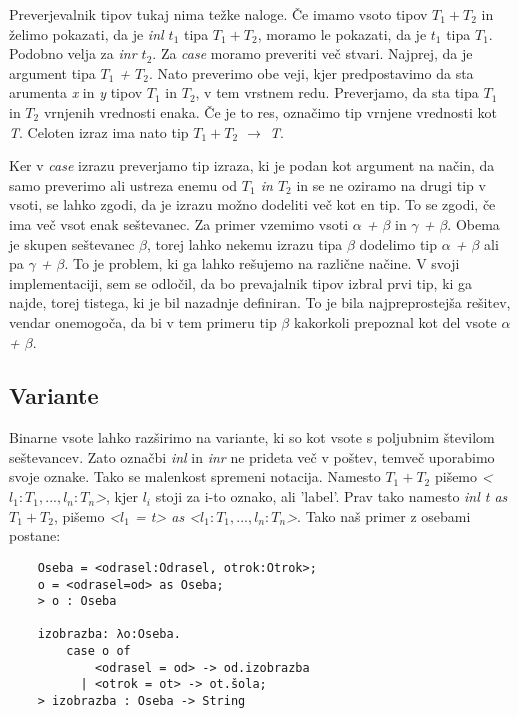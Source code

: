 \documentclass[a4paper]{report}
\begin{document}
Preverjevalnik tipov tukaj nima težke naloge. Če imamo vsoto tipov \(T_1 + T_2\) in želimo pokazati, da je \emph{inl $t_1$} tipa \emph{$T_1 + T_2$}, moramo le pokazati, da je 
\emph{$t_1$} tipa \emph{$T_1$}. Podobno velja za \emph{inr $t_2$}. Za \emph{case} moramo preveriti več stvari. Najprej, da je argument tipa \emph{$T_1$ + $T_2$}. Nato preverimo 
obe veji, kjer predpostavimo da sta arumenta \emph{x} in \emph{y} tipov \emph{$T_1$} in \emph{$T_2$}, v tem vrstnem redu. Preverjamo, da sta tipa \emph{$T_1$} in \emph{$T_2$} 
vrnjenih vrednosti enaka. Če je to res, označimo tip vrnjene vrednosti kot \emph{T}. Celoten izraz ima nato tip \emph{$T_1 + T_2$ $\rightarrow$ T}.

Ker v \emph{case} izrazu preverjamo tip izraza, ki je podan kot argument na način, da samo preverimo ali ustreza enemu od \emph{\(T_1\) in \(T_2\)} in se ne oziramo na drugi tip v vsoti, 
se lahko zgodi, da je izrazu možno dodeliti več kot en tip. To se zgodi, če ima več vsot enak seštevanec. Za primer vzemimo vsoti \emph{$\alpha$ + $\beta$} in \emph{$\gamma$ + $\beta$}.
Obema je skupen seštevanec \emph{$\beta$}, torej lahko nekemu izrazu tipa \emph{$\beta$} dodelimo tip \emph{$\alpha$ + $\beta$} ali pa \emph{$\gamma$ + $\beta$}. To je problem, ki ga
lahko rešujemo na različne načine. V svoji implementaciji, sem se odločil, da bo prevajalnik tipov izbral prvi tip, ki ga najde, torej tistega, ki je bil nazadnje definiran. To je bila 
najpreprostejša rešitev, vendar onemogoča, da bi v tem primeru tip \emph{$\beta$} kakorkoli prepoznal kot del vsote \emph{$\alpha$ + $\beta$}.

\subsection{Variante}
Binarne vsote lahko razširimo na variante, ki so kot vsote s poljubnim številom seštevancev. Zato označbi \emph{inl} in \emph{inr} ne prideta več v poštev, temveč uporabimo svoje oznake. 
Tako se malenkost spremeni notacija. Namesto \emph{$T_1 + T_2$} pišemo \emph{<$l_1:T_1, ... , l_n:T_n$>}, kjer \(l_i\) stoji za i-to oznako, ali 'label'. Prav tako namesto \emph{inl t as 
$T_1 + T_2$}, pišemo \emph{<$l_1$ = t> as <$l_1:T_1, ... , l_n:T_n$>}. Tako naš primer z osebami postane:
\begin{lstlisting}
    Oseba = <odrasel:Odrasel, otrok:Otrok>;
    o = <odrasel=od> as Oseba;
    > o : Oseba

    izobrazba: λo:Oseba.
        case o of
            <odrasel = od> -> od.izobrazba
          | <otrok = ot> -> ot.šola;
    > izobrazba : Oseba -> String
\end{lstlisting}
\end{document}
